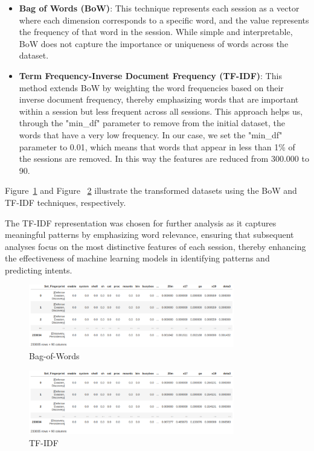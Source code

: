         \begin{itemize}
        
            \item \textbf{Bag of Words (BoW)}: This technique represents each session as a vector where each dimension corresponds to a specific word, and the value represents the frequency of that word in the session. While simple and interpretable, BoW does not capture the importance or uniqueness of words across the dataset.
            
            \vspace{0.3em}
            
            \item \textbf{Term Frequency-Inverse Document Frequency (TF-IDF)}: This method extends BoW by weighting the word frequencies based on their inverse document frequency, thereby emphasizing words that are important within a session but less frequent across all sessions. This approach helps us, through the "min\_df" parameter to remove from the initial dataset, the words that have a very low frequency. In our case, we set the "min\_df" parameter to 0.01, which means that words that appear in less than 1\% of the sessions are removed. In this way the features are reduced from 300.000 to 90.
            
        \end{itemize}

        Figure~\ref{fig:bow} and Figure ~\ref{fig:tf-idf} illustrate the transformed datasets using the BoW and TF-IDF techniques, respectively.
        
        The TF-IDF representation was chosen for further analysis as it captures meaningful patterns by emphasizing word relevance, ensuring that subsequent analyses focus on the most distinctive features of each session, thereby enhancing the effectiveness of machine learning models in identifying patterns and predicting intents.

        \begin{figure}[H]
            \centering
            \includegraphics[width=0.80\textwidth]{../figures/others/dataset_bow_1.png}
            \vspace{-0.3cm}
            \caption{Bag-of-Words}
            \label{fig:bow}
        \end{figure}
        
        \vspace{-0.5cm}
        
        \begin{figure}[H]
            \centering
            \includegraphics[width=0.80\textwidth]{../figures/others/dataset_tf-idf_1.png}
            \vspace{-0.3cm}
            \caption{TF-IDF}
            \label{fig:tf-idf}
        \end{figure}
